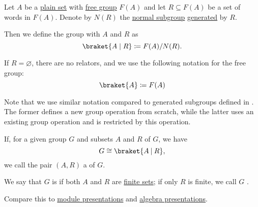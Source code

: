 \begin{definition}\label{def:group_presentation}
  Let \( A \) be a \hyperref[def:set]{plain set} with \hyperref[def:free_group]{free group} \( F(A) \) and let \( R \subseteq F(A) \) be a set of words in \( F(A) \). Denote by \( N(R) \) the \hyperref[thm:normal_subgroup_equivalences]{normal subgroup} \hyperref[def:first_order_generated_substructure]{generated} by \( R \).

  Then we define the group with  \( A \) and  \( R \) as
  \begin{equation}\label{eq:def:group_presentation/presentation}
    \braket{ A \mid R } \coloneqq F(A) / N(R).
  \end{equation}

  If \( R = \varnothing \), there are no relators, and we use the following notation for the free group:
  \begin{equation}\label{eq:def:group_presentation/free}
    \braket{ A } \coloneqq F(A)
  \end{equation}

  Note that we use similar notation compared to generated subgroups defined in . The former defines a new group operation from scratch, while the latter uses an existing group operation and is restricted by this operation.

  If, for a given group \( G \) and subsets \( A \) and \( R \) of \( G \), we have
  \begin{equation*}
    G \cong \braket{ A \given R },
  \end{equation*}
  we call the pair \( (A, R) \) a  of \( G \).

  We say that \( G \) is  if both \( A \) and \( R \) are \hyperref[def:set_finiteness]{finite sets}; if only \( R \) is finite, we call \( G \) .

  Compare this to \hyperref[def:module_presentation]{module presentations} and \hyperref[def:algebra_presentation]{algebra presentations}.
\end{definition}


